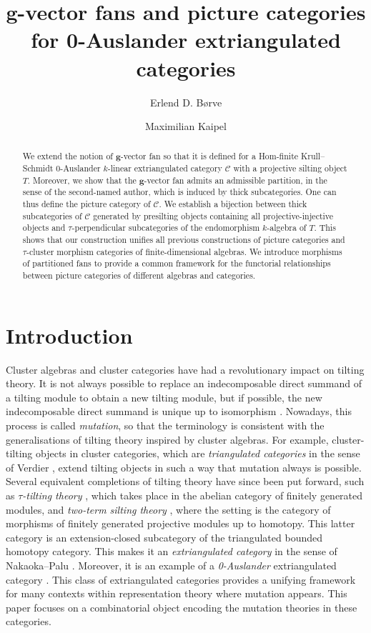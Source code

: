 \documentclass[10pt,twoside, a4paper,reqno]{amsart}
\title[$\mathbf{g}$-vector fans and picture categories for 0-Auslander extriangulated categories]{$\mathbf{g}$-vector fans and picture categories for 0-Auslander extriangulated categories}
\author[E. D. Børve]{Erlend D. Børve}
\author[M. Kaipel]{Maximilian Kaipel}
\newcommand{\calC}{\mathcal{C}}
\newcommand{\bfg}{\mathbf{g}}
\theoremstyle{definition}
\begin{document}
\begin{abstract}
    We extend the notion of $\bfg$-vector fan so that it is defined for a Hom-finite Krull--Schmidt 0-Auslander $k$-linear extriangulated category $\calC$ with a {projective} silting object {$T$}. Moreover, we show that the $\bfg$-vector fan admits an admissible partition, in the sense of the second-named author, which is induced by thick subcategories. One can thus define the picture category of $\calC$. We establish a bijection between thick subcategories of $\calC$ generated by presilting objects containing all projective-injective objects and $\tau$-perpendicular subcategories of the endomorphism $k$-algebra of $T$. This shows that our construction unifies all previous constructions of picture categories and $\tau$-cluster morphism categories of finite-dimensional algebras. We introduce morphisms of partitioned fans to {provide a common framework for} the functorial relationships between picture categories of different algebras and categories.
\end{abstract}

\maketitle

\section{Introduction}

Cluster algebras \cite{FZ02i,FZ02ii,BFZ05,FZ07} and cluster categories \cite{BMRRT06} have had a revolutionary impact on tilting theory. It is not always possible to replace an indecomposable direct summand of a tilting module to obtain a new tilting module, but if possible, the new indecomposable direct summand is unique up to isomorphism \cite{BB80,HR82}. Nowadays, this process is called \textit{mutation}, so that the terminology is consistent with the generalisations of tilting theory inspired by cluster algebras. For example, cluster-tilting objects \cite{BMR07} in cluster categories, which are \textit{triangulated categories} in the sense of Verdier \cite{Ver96}, extend tilting objects in such a way that mutation always is possible. Several equivalent completions of tilting theory have since been put forward, such as
\textit{$\tau$-tilting theory} \cite{AIR2014}, which takes place in the abelian category of finitely generated modules, and \textit{two-term silting theory} \cite{DerksenFei2015,AIR2014}, where the setting is the category of morphisms of finitely generated projective modules up to homotopy. This latter category is an extension-closed subcategory of the triangulated bounded homotopy category. This makes it an \textit{extriangulated category} in the sense of Nakaoka--Palu \cite{NP19}. Moreover, it is an example of a \textit{0-Auslander} extriangulated category \cite{GNP23}. This class of extriangulated categories provides a unifying framework for many contexts within representation theory where mutation appears. This paper focuses on a combinatorial object encoding the mutation theories in these categories.
\end{document}
